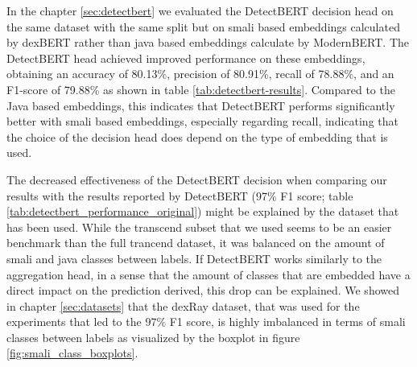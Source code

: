 In the chapter \ref{sec:detectbert} we evaluated the DetectBERT decision head on the same 
dataset with the same split but on smali based embeddings calculated by dexBERT rather 
than java based embeddings calculate by ModernBERT. 
The DetectBERT head achieved improved performance on these embeddings, 
obtaining an accuracy of 80.13\%, precision of 80.91\%, recall of 78.88\%, and an F1-score of 79.88\% 
as shown in table \ref{tab:detectbert-results}.
Compared to the Java based embeddings, this indicates that DetectBERT performs significantly better 
with smali based embeddings, especially regarding recall, 
indicating that the choice of the decision head does depend on the type of embedding that is used.

The decreased effectiveness of the DetectBERT decision when comparing our results with the results 
reported by DetectBERT (97\% F1 score; table \ref{tab:detectbert_performance_original}) might be explained 
by the dataset that has been used. While the transcend subset that we used seems to be an easier benchmark 
than the full trancend dataset, it was balanced on the amount of smali and java classes between labels.
If DetectBERT works similarly to the aggregation head, in a sense that the amount of classes 
that are embedded have a direct impact on the prediction derived, this drop can be explained.
We showed in chapter \ref{sec:datasets} that the dexRay dataset, that was used for the experiments that 
led to the 97\% F1 score, is highly imbalanced in terms of smali classes between labels as visualized by the 
boxplot in figure \ref{fig:smali_class_boxplots}.

